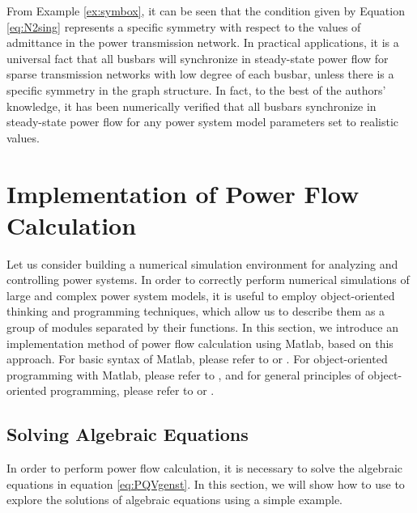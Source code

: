 \documentclass[graybox, envcountchap]{svmult}
\begin{document}
From Example \ref{ex:symbox}, it can be seen that the condition given by
Equation \ref{eq:N2sing} represents a specific symmetry with respect to the
values of admittance in the power transmission network. In practical
applications, it is a universal fact that all busbars will synchronize in
steady-state power flow for sparse transmission networks with low degree of each
busbar, unless there is a specific symmetry in the graph structure. In fact, to
the best of the authors' knowledge, it has been numerically verified that all
busbars synchronize in steady-state power flow for any power system model
parameters set to realistic values.

\section{Implementation of Power Flow Calculation}\label{sec:powfcal}

Let us consider building a numerical simulation environment for analyzing and
controlling power systems. In order to correctly perform numerical simulations
of large and complex power system models, it is useful to employ object-oriented
thinking and programming techniques, which allow us to describe them as a group
of modules separated by their functions. In this section, we introduce an
implementation method of power flow calculation using Matlab, based on this
approach. For basic syntax of Matlab, please refer to \cite{Kamisaka2011} or
\cite{Kitamura2016}. For object-oriented programming with Matlab, please refer
to \cite{Kobayashi2020}, and for general principles of object-oriented
programming, please refer to \cite{Hirasawa2021} or \cite{Sandi_Metz2016}.

\subsection{Solving Algebraic Equations}
In order to perform power flow calculation, it is necessary to solve the
algebraic equations in equation \ref{eq:PQVgenst}. In this section, we will show
how to use \matlab to explore the solutions of algebraic equations using a simple
example.
\end{document}
